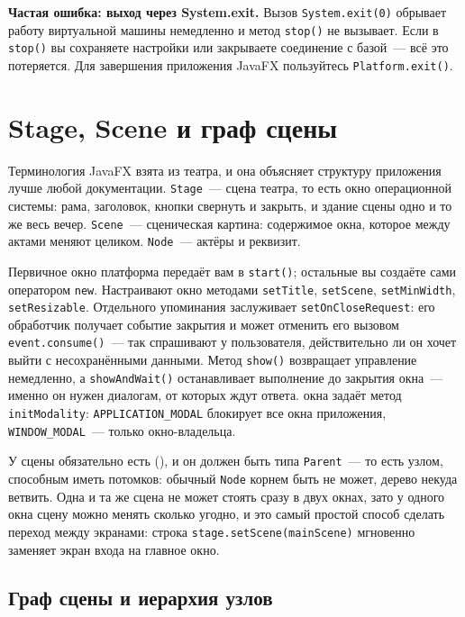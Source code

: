 \begin{oshibka}
\textbf{Частая ошибка: выход через System.exit.} Вызов \texttt{System.exit(0)}
обрывает работу виртуальной машины немедленно и метод \texttt{stop()} не
вызывает. Если в \texttt{stop()} вы сохраняете настройки или закрываете
соединение с базой~--- всё это потеряется. Для завершения приложения JavaFX
пользуйтесь \texttt{Platform.exit()}.
\end{oshibka}

\section{Stage, Scene и граф сцены}

Терминология JavaFX взята из театра, и она объясняет структуру приложения лучше
любой документации. \texttt{Stage}~--- сцена театра, то есть окно операционной
системы: рама, заголовок, кнопки свернуть и закрыть, и здание сцены одно и то же
весь вечер. \texttt{Scene}~--- сценическая картина: содержимое окна, которое
между актами меняют целиком. \texttt{Node}~--- актёры и реквизит.

Первичное окно платформа передаёт вам в \texttt{start()}; остальные вы создаёте
сами оператором \texttt{new}. Настраивают окно методами \texttt{setTitle},
\texttt{setScene}, \texttt{setMinWidth}, \texttt{setResizable}. Отдельного
упоминания заслуживает \texttt{setOnCloseRequest}: его обработчик получает
событие закрытия и может отменить его вызовом \texttt{event.consume()}~--- так
спрашивают у пользователя, действительно ли он хочет выйти с несохранёнными
данными. Метод \texttt{show()} возвращает управление немедленно, а
\texttt{showAndWait()} останавливает выполнение до закрытия окна~--- именно он
нужен диалогам, от которых ждут ответа.  окна задаёт метод
\texttt{initModality}: \texttt{APPLICATION\_MODAL} блокирует все окна
приложения, \texttt{WINDOW\_MODAL}~--- только окно-владельца.

У сцены обязательно есть  (), и он должен быть
типа \texttt{Parent}~--- то есть узлом, способным иметь потомков: обычный
\texttt{Node} корнем быть не может, дерево некуда ветвить. Одна и та же сцена не
может стоять сразу в двух окнах, зато у одного окна сцену можно менять сколько
угодно, и это самый простой способ сделать переход между экранами: строка
\texttt{stage.setScene(mainScene)} мгновенно заменяет экран входа на главное
окно.

\subsection{Граф сцены и иерархия узлов}

